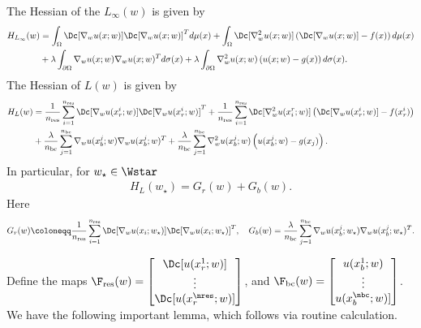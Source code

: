 \begin{lemma}
    The Hessian of the $L_\infty(w)$ is given by
    \begin{align*}
    H_{L_\infty}(w) & = \int_{\Omega}\Dc[\nabla_w u(x;w)]\Dc[\nabla_w u(x;w)]^{T}d\mu(x)+\int_{\Omega}\Dc[\nabla^2_w u(x;w)]\left(\Dc[\nabla_w u(x;w)]-f(x)\right)d\mu(x)\\
    & + \lambda\int_{\partial \Omega}\nabla_w u(x; w)\nabla_w u(x; w)^{T}d\sigma(x) + \lambda\int_{\partial \Omega}\nabla^2_w u(x; w)\left(u(x;w)-g(x)\right)d\sigma(x). 
    \end{align*}
    The Hessian of $L(w)$ is given by
    \begin{align}
       H_L(w) & = \frac{1}{n_{\textup{res}}}\sum^{n_{\textup{res}}}_{i=1}\Dc[\nabla_w u(x_r^i; w)]\Dc[\nabla_w u(x_r^i; w)]^{T}+\frac{1}{n_{\textup{res}}}\sum^{n_{\textup{res}}}_{i=1}\Dc[\nabla^2_w u(x^r_i;w)]\left(\Dc[\nabla_w u(x_r^i;w)]-f(x_r^i)\right)\\
       & +\frac{\lambda}{n_{\textup{bc}}}\sum_{j=1}^{n_{\textup{bc}}}\nabla_w u(x_b^j;w)\nabla_w u(x_b^j;w)^{T} + \frac{\lambda}{n_{\textup{bc}}}\sum^{n_{\textup{bc}}}_{j=1}\nabla^2_w u(x_b^j;w)\left(u(x_b^j;w)-g(x_j)\right). \nonumber
    \end{align}
    In particular, for $w_\star\in \Wstar$
    \begin{align*}
        H_L(w_\star) = G_r(w)+ G_b(w).
    \end{align*}
    Here 
    \[
    G_r(w) \coloneqq \frac{1}{n_{\textup{res}}}\sum^{n_{\textup{res}}}_{i=1}\Dc[\nabla_w u(x_i; w_\star)]\Dc[\nabla_w u(x_i; w_\star)]^{T},\quad G_b(w) = \frac{\lambda}{n_{\textup{bc}}}\sum_{j=1}^{n_{\textup{bc}}}\nabla_w u(x_b^j;w_\star)\nabla_w u(x_b^j;w_\star)^{T}.
    \]
\end{lemma}
Define the maps $\F_{\textup{res}}(w) = \begin{bmatrix}
    \Dc[u(x_r^1;w)] \\
    \vdots \\
    \Dc[u(x_r^{\nres};w)]
\end{bmatrix}$,
and $\F_{\textup{bc}}(w) = \begin{bmatrix}
    u(x_b^1;w) \\
    \vdots \\
    u(x_b^{\nbc};w)]
\end{bmatrix}$.
We have the following important lemma, which follows via routine calculation. 
